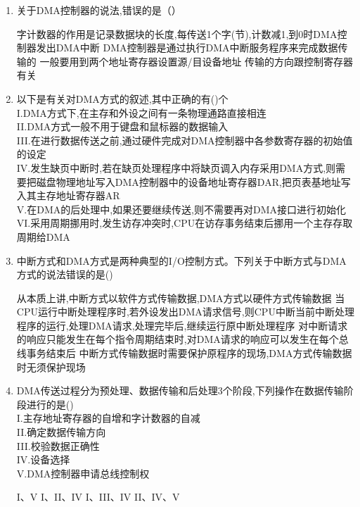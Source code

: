 \documentclass[12pt, a4paper, oneside, UTF8]{ctexbook}
\begin{document}
\begin{enumerate}
    \item 关于DMA控制器的说法,错误的是（）
    \begin{choices}[1]
    \task 字计数器的作用是记录数据块的长度,每传送1个字(节),计数减1,到0时DMA控制器发出DMA中断
    \task DMA控制器是通过执行DMA中断服务程序来完成数据传输的
    \task 一般要用到两个地址寄存器设置源/目设备地址
    \task 传输的方向跟控制寄存器有关
    \end{choices}

    \item 以下是有关对DMA方式的叙述,其中正确的有(\qquad)个\\
    I.DMA方式下,在主存和外设之间有一条物理通路直接相连\\
    II.DMA方式一般不用于键盘和鼠标器的数据输入\\
    III.在进行数据传送之前,通过硬件完成对DMA控制器中各参数寄存器的初始值的设定\\
    IV.发生缺页中断时,若在缺页处理程序中将缺页调入内存采用DMA方式,则需要把磁盘物理地址写入DMA控制器中的设备地址寄存器DAR,把页表基地址写入其主存地址寄存器AR\\
    V.在DMA的后处理中,如果还要继续传送,则不需要再对DMA接口进行初始化\\
    VI.采用周期挪用时,发生访存冲突时,CPU在访存事务结束后挪用一个主存存取周期给DMA
    \begin{choices}
    \end{choices}

    \item 中断方式和DMA方式是两种典型的I/O控制方式。下列关于中断方式与DMA方式的说法错误的是(\qquad)
    \begin{choices}[1]
    \task 从本质上讲,中断方式以软件方式传输数据,DMA方式以硬件方式传输数据
    \task 当CPU运行中断处理程序时,若外设发出DMA请求信号,则CPU中断当前中断处理程序的运行,处理DMA请求,处理完毕后,继续运行原中断处理程序
    \task 对中断请求的响应只能发生在每个指令周期结束时,对DMA请求的响应可以发生在每个总线事务结束后
    \task 中断方式传输数据时需要保护原程序的现场,DMA方式传输数据时无须保护现场
    \end{choices}

    \item DMA传送过程分为预处理、数据传输和后处理3个阶段,下列操作在数据传输阶段进行的是(\qquad)\\
    I.主存地址寄存器的自增和字计数器的自减\\
    II.确定数据传输方向\\
    III.校验数据正确性\\
    IV.设备选择\\
    V.DMA控制器申请总线控制权
    \begin{choices}
    \task I、V
    \task I、II、IV
    \task I、III、IV
    \task II、IV、V
    \end{choices}


\end{enumerate}
\end{document}
